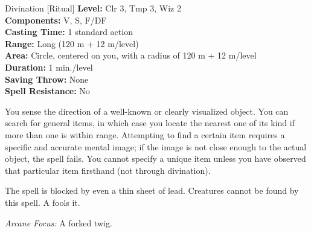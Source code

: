 {Divination [Ritual]}
{
	\textbf{Level:}
	Clr 3, Tmp 3, Wiz 2\\
	\textbf{Components:}
	V, S, F/DF\\
	\textbf{Casting Time:}
	1 standard action\\
	\textbf{Range:}
	Long (120 m + 12 m/level)\\
	\textbf{Area:}
	Circle, centered on you, with a radius of 120 m + 12 m/level\\
	\textbf{Duration:}
	1 min./level\\
	\textbf{Saving Throw:}
	None\\
	\textbf{Spell Resistance:}
	No\\
}
{
	You sense the direction of a well-known or clearly visualized object. You can search for general items, in which case you locate the nearest one of its kind if more than one is within range. Attempting to find a certain item requires a specific and accurate mental image; if the image is not close enough to the actual object, the spell fails. You cannot specify a unique item unless you have observed that particular item firsthand (not through divination).

	The spell is blocked by even a thin sheet of lead. Creatures cannot be found by this spell. A  fools it.

	\textit{Arcane Focus:}
	A forked twig.

}
